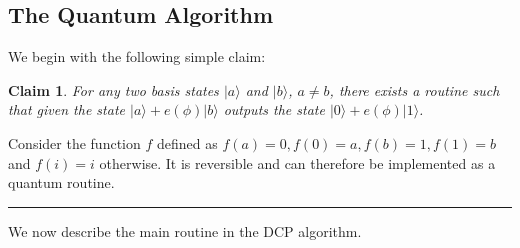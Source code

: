 \documentclass[11pt]{article}
\newtheorem{claim}[theorem]{Claim}
\newcommand{\qedsymb}{\hfill{\rule{2mm}{2mm}}}
\newenvironment{proof}{\begin{trivlist}
\item[\hspace{\labelsep}{\sl\noindent Proof:\/}]
}{\qedsymb\end{trivlist}}
\newcommand\ket[1]{{ |{#1} \rangle }}
\newcommand\alternate[2]{{#1}}
\begin{document}
\subsection{The Quantum Algorithm}

\alternate{We begin with the following simple claim:}{}

\begin{claim}\label{to_one_qubit}
For any two basis states $\ket{a}$ and $\ket{b}$, $a\neq b$, there exists a routine such that
given the state $\ket{a}+e(\phi)\ket{b}$ outputs the state $\ket{0}+e(\phi)\ket{1}$.
\end{claim}
\begin{proof}
Consider the function $f$ defined as $f(a)=0, f(0)=a, f(b)=1, f(1)=b$ and $f(i)=i$ otherwise. It is reversible and can
therefore be implemented as a quantum routine.
\end{proof}

We now describe the main routine in the DCP algorithm.
\end{document}
